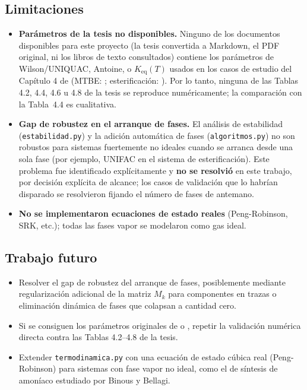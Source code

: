 \documentclass[11pt,a4paper]{article}
\begin{document}
\subsection{Limitaciones}
\label{sec:limitaciones}

\begin{itemize}
  \item \textbf{Parámetros de la tesis no disponibles.} Ninguno de los
    documentos disponibles para este proyecto (la tesis convertida a
    Markdown, el PDF original, ni los libros de texto consultados)
    contiene los parámetros de Wilson/UNIQUAC, Antoine, o $K_{\text{eq}}(T)$
    usados en los casos de estudio del Capítulo 4 de
    \citet{tsanas2018} (MTBE: \citet{ungdoherty1995}; esterificación:
    \citet{xiao1989}). Por lo tanto, ninguna de las Tablas 4.2, 4.4,
    4.6 u 4.8 de la tesis se reproduce numéricamente; la comparación
    con la Tabla~4.4 es cualitativa.
  \item \textbf{Gap de robustez en el arranque de fases.} El análisis
    de estabilidad (\texttt{estabilidad.py}) y la adición automática de
    fases (\texttt{algoritmos.py}) no son robustos para sistemas
    fuertemente no ideales cuando se arranca desde una sola fase (por
    ejemplo, UNIFAC en el sistema de esterificación). Este problema fue
    identificado explícitamente y \textbf{no se resolvió} en este
    trabajo, por decisión explícita de alcance; los casos de validación
    que lo habrían disparado se resolvieron fijando el número de fases
    de antemano.
  \item \textbf{No se implementaron ecuaciones de estado reales}
    (Peng-Robinson, SRK, etc.); todas las fases vapor se modelaron como
    gas ideal.
\end{itemize}

\subsection{Trabajo futuro}

\begin{itemize}
  \item Resolver el gap de robustez del arranque de fases, posiblemente
    mediante regularización adicional de la matriz $M_k$ para
    componentes en trazas o eliminación dinámica de fases que colapsan
    a cantidad cero.
  \item Si se consiguen los parámetros originales de
    \citet{ungdoherty1995} o \citet{xiao1989}, repetir la validación
    numérica directa contra las Tablas 4.2--4.8 de la tesis.
  \item Extender \texttt{termodinamica.py} con una ecuación de estado
    cúbica real (Peng-Robinson) para sistemas con fase vapor no ideal,
    como el de síntesis de amoníaco estudiado por
    Binous y Bellagi.
\end{itemize}



\end{document}
